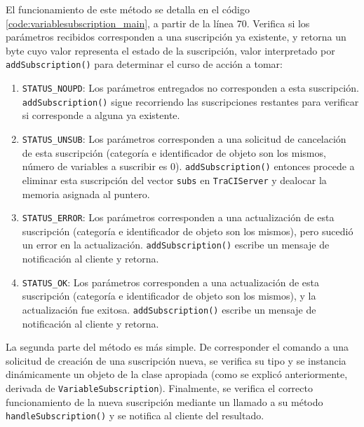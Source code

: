 El funcionamiento de este método se detalla en el código \ref{code:variablesubscription_main}, a partir de la línea 70. Verifica si los parámetros recibidos corresponden a una suscripción ya existente, y retorna un byte cuyo valor representa el estado de la suscripción, valor interpretado por \texttt{addSubscription()} para determinar el curso de acción a tomar:
\begin{enumerate}
    \item \texttt{STATUS\_NOUPD}: Los parámetros entregados no corresponden a esta suscripción. \texttt{addSubscription()} sigue recorriendo las suscripciones restantes para verificar si corresponde a alguna ya existente.
    \item \texttt{STATUS\_UNSUB}: Los parámetros corresponden a una solicitud de cancelación de esta suscripción (categoría e identificador de objeto son los mismos, número de variables a suscribir es $0$). \texttt{addSubscription()} entonces procede a eliminar esta suscripción del vector \texttt{subs} en \texttt{TraCIServer} y dealocar la memoria asignada al puntero.
    \item \texttt{STATUS\_ERROR}: Los parámetros corresponden a una actualización de esta suscripción (categoría e identificador de objeto son los mismos), pero sucedió un error en la actualización. \texttt{addSubscription()} escribe un mensaje de notificación al cliente y retorna.
    \item \texttt{STATUS\_OK}: Los parámetros corresponden a una actualización de esta suscripción (categoría e identificador de objeto son los mismos), y la actualización fue exitosa. \texttt{addSubscription()} escribe un mensaje de notificación al cliente y retorna.
\end{enumerate}



La segunda parte del método es más simple. De corresponder el comando a una solicitud de creación de una suscripción nueva, se verifica su tipo y se instancia dinámicamente un objeto de la clase apropiada (como se explicó anteriormente, derivada de \texttt{VariableSubscription}). Finalmente, se verifica el correcto funcionamiento de la nueva suscripción mediante un llamado a su método \texttt{handleSubscription()} y se notifica al cliente del resultado.


    
